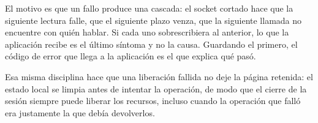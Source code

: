 El motivo es que un fallo produce una cascada: el socket cortado hace que la
siguiente lectura falle, que el siguiente plazo venza, que la siguiente
llamada no encuentre con quién hablar. Si cada uno sobrescribiera al anterior,
lo que la aplicación recibe es el último síntoma y no la causa. Guardando el
primero, el código de error que llega a la aplicación es el que explica qué
pasó.

Esa misma disciplina hace que una liberación fallida no deje la página
retenida: el estado local se limpia antes de intentar la operación, de modo
que el cierre de la sesión siempre puede liberar los recursos, incluso cuando
la operación que falló era justamente la que debía devolverlos.
